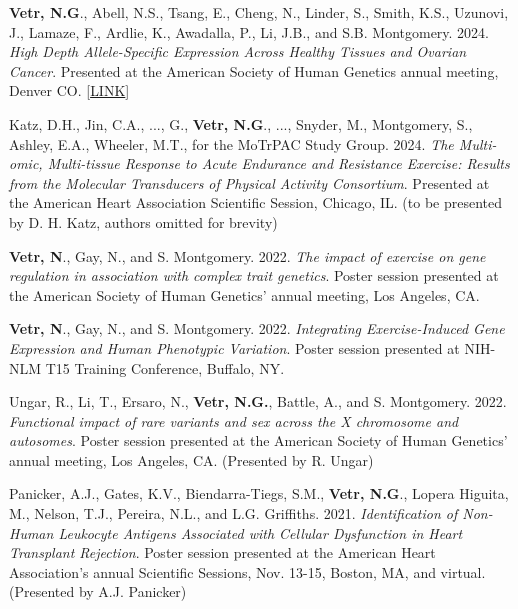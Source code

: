 \documentclass[12pt]{article}
\begin{document}
\begin{enumerate}[label={[\arabic*]}]

\item \textbf{Vetr, N.G}., Abell, N.S., Tsang, E., Cheng, N., Linder, S., Smith, K.S., Uzunovi, J., Lamaze, F., Ardlie, K., Awadalla, P., Li, J.B., and S.B. Montgomery. 2024. \emph{High Depth Allele-Specific Expression Across Healthy Tissues and Ovarian Cancer}. Presented at the American Society of Human Genetics annual meeting, Denver CO. [\href{https://drive.google.com/file/d/15JSeHtKpoYTcL5_PG1dS9q7A-rwfBjP_/view?usp=sharing}{LINK}]

\item Katz, D.H., Jin, C.A., ..., G., \textbf{Vetr, N.G}., ..., Snyder, M., Montgomery, S., Ashley, E.A., Wheeler, M.T., for the MoTrPAC Study Group. 2024. \emph{The Multi-omic, Multi-tissue Response to Acute Endurance and Resistance Exercise: Results from the Molecular Transducers of Physical Activity Consortium}. Presented at the American Heart Association Scientific Session, Chicago, IL. (to be presented by D. H. Katz, authors omitted for brevity)

\item \textbf{Vetr, N}., Gay, N., and S. Montgomery. 2022. \emph{The impact of exercise on gene regulation in association with complex trait genetics}. Poster session presented at the American Society of Human Genetics' annual meeting, Los Angeles, CA.

\item \textbf{Vetr, N}., Gay, N., and S. Montgomery. 2022. \emph{Integrating Exercise-Induced Gene Expression and Human Phenotypic Variation}. Poster session presented at NIH-NLM T15 Training Conference, Buffalo, NY.

\item Ungar, R., Li, T., Ersaro, N., \textbf{Vetr, N.G.}, Battle, A., and S. Montgomery. 2022. \emph{Functional impact of rare variants and sex across the X chromosome and autosomes}. Poster session presented at the American Society of Human Genetics' annual meeting, Los Angeles, CA. (Presented by R. Ungar)

\item Panicker, A.J., Gates, K.V., Biendarra-Tiegs, S.M., \textbf{Vetr, N.G}., Lopera Higuita, M., Nelson, T.J., Pereira, N.L., and L.G. Griffiths. 2021. \emph{Identification of Non-Human Leukocyte Antigens Associated with Cellular Dysfunction in Heart Transplant Rejection}. Poster session presented at the American Heart Association’s annual Scientific Sessions, Nov. 13-15, Boston, MA, and virtual. (Presented by A.J. Panicker)


\end{enumerate}
\end{document}
